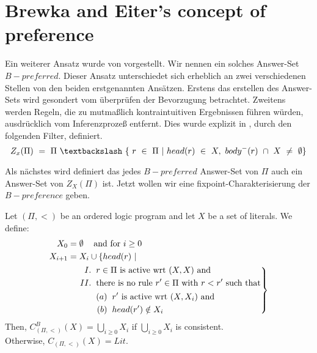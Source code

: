 \section{Brewka and Eiter's concept of preference}


Ein weiterer Ansatz wurde von \cite{BrewkaEiter1999} vorgestellt. Wir nennen ein solches Answer-Set $B-preferred$. Dieser Ansatz unterschiedet sich erheblich an zwei verschiedenen Stellen von den beiden erstgenannten Ansätzen. Erstens das erstellen des Answer-Sets wird gesondert vom überprüfen der Bevorzugung betrachtet.
Zweitens werden Regeln, die zu mutmaßlich kontraintuitiven Ergebnissen führen würden, ausdrücklich vom Inferenzprozeß entfernt. Dies wurde explizit in \cite{BrewkaEiter2000}, durch den folgenden Filter, definiert. \\

  \begin{equation}
	Z_x(\Pi)~=~\Pi~\textbackslash~\{~r~\in~\Pi~|~head(r)~\in~X,~body^-(r)~\cap~X~\neq~\emptyset \}
  \label{eq:1}
\end{equation}

Als nächstes wird definiert das jedes $B-preferred$ Answer-Set von $\Pi$ auch ein Answer-Set von $Z_X(\Pi)$ ist. Jetzt wollen wir eine fixpoint-Charakterisierung der $B-preference$ geben.\\

\begin{definition}
  Let $(\Pi, <)$ be an ordered logic program and let $X$ be a set of literals.
  We define:
  \begin{equation*}
    \begin{split}
      X_0 & = \emptyset\hspace*{0.3cm} \text{~and for~} i \geq 0 \\
      X_{i+1} & = X_i \cup \{ head(r)~| \\
        & \hspace*{0.4cm}\left. \begin{aligned}
          I. &\hspace*{0.2cm} r \in \Pi \text{~is active wrt~} (X, X) \text{~and} \\
          II. &\hspace*{0.2cm} \text{there is no rule~} r' \in \Pi \text{~with~} r < r'
          \text{~such that} \\
          & \hspace*{0.2cm} \begin{aligned}
            (a) &\hspace*{0.2cm} r' \text{~is active wrt~} (X, X_i) \text{~and} \\
            (b) &\hspace*{0.2cm} head(r') \notin X_i
          \end{aligned}
        \end{aligned}
      \right \}
    \end{split}
  \end{equation*}
  Then, $C^{B}_{(\Pi, <)}(X) = \bigcup_{i\geq 0} X_i$ if $\bigcup_{i\geq 0} X_i$ is
  consistent. \\Otherwise, $C_{(\Pi, <)}(X) = Lit$.
  \label{def:1}
\end{definition}


